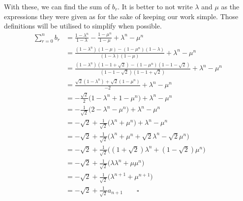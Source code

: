 \documentclass[12pt]{article}
\begin{document}
With these, we can find the sum of $b_r$.
It is better to not write $\lambda$ and $\mu$ as the expressions they were given as for the sake of keeping our work simple.
Those definitions will be utilised to simplify when possible.
\begin{align*}
    \sum_{r=0}^{n} b_r & = \frac{1-\lambda^n}{1-\lambda} - \frac{1-\mu^n}{1-\mu} + \lambda^n - \mu^n                                      \\
                       & = \frac{(1-\lambda^n)(1-\mu) - (1-\mu^n)(1-\lambda)}{(1-\lambda)(1-\mu)} + \lambda^n - \mu^n                     \\
                       & = \frac{(1-\lambda^n)(1-1+\sqrt{2}) - (1-\mu^n)(1-1-\sqrt{2})}{(1-1-\sqrt{2})(1-1+\sqrt{2})} + \lambda^n - \mu^n \\
                       & = \frac{\sqrt{2}(1-\lambda^n) + \sqrt{2}(1-\mu^n)}{-2} + \lambda^n - \mu^n                                       \\
                       & = -\frac{\sqrt{2}}{2}\bigg(1-\lambda^n+1-\mu^n\bigg) + \lambda^n - \mu^n                                         \\
                       & = -\frac{1}{\sqrt{2}}\bigg(2-\lambda^n-\mu^n\bigg) + \lambda^n - \mu^n                                           \\
                       & = -\sqrt{2} + \frac{1}{\sqrt{2}}\bigg(\lambda^n+\mu^n\bigg) + \lambda^n - \mu^n                                  \\
                       & = -\sqrt{2} + \frac{1}{\sqrt{2}}\bigg(\lambda^n+\mu^n + \sqrt{2}\lambda^n - \sqrt{2}\mu^n\bigg)                  \\
                       & = -\sqrt{2} + \frac{1}{\sqrt{2}}\bigg(\left(1+\sqrt{2}\right)\lambda^n + \left(1-\sqrt{2}\right)\mu^n\bigg)      \\
                       & = -\sqrt{2} + \frac{1}{\sqrt{2}}\bigg(\lambda\lambda^n + \mu\mu^n\bigg)                                          \\
                       & = -\sqrt{2} + \frac{1}{\sqrt{2}}\bigg(\lambda^{n+1} + \mu^{n+1}\bigg)                                            \\
                       & = -\sqrt{2} + \frac{1}{\sqrt{2}}a_{n+1} \qquad \square
\end{align*}
\end{document}

